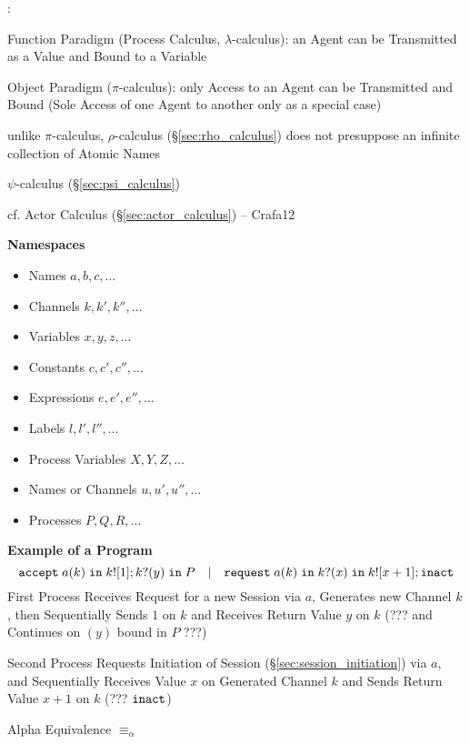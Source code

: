 \cite{milner92}:

Function Paradigm (Process Calculus, $\lambda$-calculus): an Agent can
be Transmitted as a Value and Bound to a Variable

Object Paradigm ($\pi$-calculus): only Access to an Agent can be
Transmitted and Bound (Sole Access of one Agent to another only as a
special case)


\asterism


unlike $\pi$-calculus, $\rho$-calculus (\S\ref{sec:rho_calculus}) does not
presuppose an infinite collection of Atomic Names

\fist $\psi$-calculus (\S\ref{sec:psi_calculus})

\fist cf. Actor Calculus (\S\ref{sec:actor_calculus}) -- Crafa12


\asterism


\textbf{Namespaces} \cite{honda-vasconcelos-kubo98}

\begin{itemize}
\item Names $a,b,c,\ldots$
\item Channels $k,k',k'',\ldots$
\item Variables $x,y,z,\ldots$
\item Constants $c,c',c'',\ldots$
\item Expressions $e,e',e'',\ldots$
\item Labels $l,l',l'',\ldots$
\item Process Variables $X,Y,Z,\ldots$
\item Names or Channels $u, u', u'', \ldots$
\item Processes $P,Q,R, \ldots$
\end{itemize}


\textbf{Example of a Program} \cite{honda-vasconcelos-kubo98}
\[
  \mathtt{accept} \; a(k) \; \mathtt{in} \; k![1];
  k?(y) \; \mathtt{in} \; P
  \quad | \quad
  \mathtt{request} \; a(k) \; \mathtt{in} \; k?(x)
  \; \mathtt{in} \; k![x+1]; \mathtt{inact}
\]
First Process Receives Request for a new Session via $a$, Generates
new Channel $k$, then Sequentially Sends $1$ on $k$ and Receives
Return Value $y$ on $k$ (??? and Continues on $(y)$ bound in $P$ ???)

Second Process Requests Initiation of Session
(\S\ref{sec:session_initiation}) via $a$, and Sequentially Receives
Value $x$ on Generated Channel $k$ and Sends Return Value $x + 1$ on
$k$ (??? $\mathtt{inact}$)

Alpha Equivalence $\equiv_\alpha$

